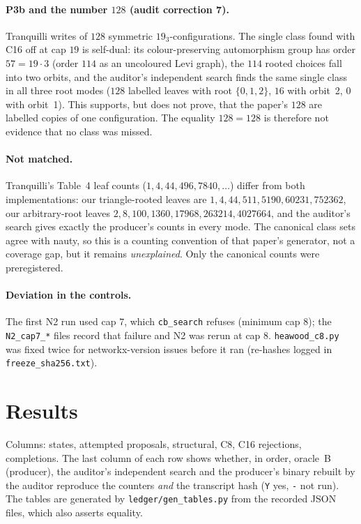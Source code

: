 \documentclass[10pt]{article}
\begin{document}
\paragraph{P3b and the number $128$ (audit correction 7).} Tranquilli writes of $128$ symmetric $19_3$-configurations. The single class found with C16 off at cap $19$ is self-dual: its colour-preserving automorphism group has order $57=19\cdot3$ (order $114$ as an uncoloured Levi graph), the $114$ rooted choices fall into two orbits, and the auditor's independent search finds the same single class in all three root modes ($128$ labelled leaves with root $\{0,1,2\}$, $16$ with orbit~2, $0$ with orbit~1). This supports, but does not prove, that the paper's $128$ are labelled copies of one configuration. The equality $128=128$ is therefore not evidence that no class was missed.
\paragraph{Not matched.} Tranquilli's Table~4 leaf counts ($1,4,44,496,7840,\dots$) differ from both implementations: our triangle-rooted leaves are $1,4,44,511,5190,60231,752362$, our arbitrary-root leaves $2,8,100,1360,17968,263214,4027664$, and the auditor's search gives exactly the producer's counts in every mode. The canonical class sets agree with nauty, so this is a counting convention of that paper's generator, not a coverage gap, but it remains \emph{unexplained}. Only the canonical counts were preregistered.
\paragraph{Deviation in the controls.} The first N2 run used cap $7$, which \texttt{cb\_search} refuses (minimum cap $8$); the \texttt{N2\_cap7\_*} files record that failure and N2 was rerun at cap $8$. \texttt{heawood\_c8.py} was fixed twice for networkx-version issues before it ran (re-hashes logged in \texttt{freeze\_sha256.txt}).

\section{Results}\label{sec:results}
Columns: states, attempted proposals, structural, C8, C16 rejections, completions. The last column of each row shows whether, in order, oracle~B (producer), the auditor's independent search and the producer's binary rebuilt by the auditor reproduce the counters \emph{and} the transcript hash (\texttt{Y} yes, \texttt{-} not run). The tables are generated by \texttt{ledger/gen\_tables.py} from the recorded JSON files, which also asserts equality.
\end{document}

